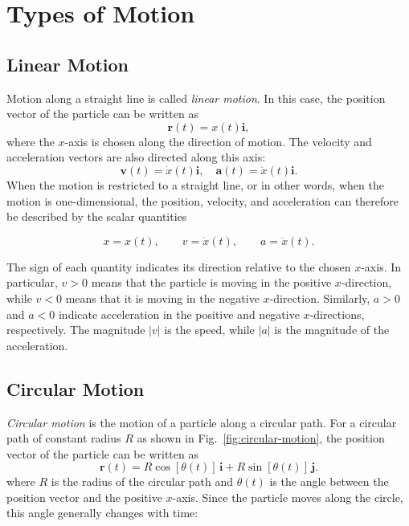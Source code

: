 \documentclass[12pt]{article}
\theoremstyle{remark}
\begin{document}
\section{Types of Motion}

\subsection{Linear Motion}
Motion along a straight line is called \emph{linear motion}. In this case, the position vector of the particle can be written as
\begin{equation}
\mathbf{r}(t) = x(t)\mathbf{i},
\end{equation}
where the $x$-axis is chosen along the direction of motion. The velocity and acceleration vectors are also directed along this axis:
\begin{equation}
\mathbf{v}(t) = \dot{x}(t)\mathbf{i}, \quad \mathbf{a}(t) = \ddot{x}(t)\mathbf{i}.
\end{equation}
When the motion is restricted to a straight line, or in other words, when the motion is one-dimensional, the position, velocity, and acceleration can therefore be described by the scalar quantities

$$
x=x(t), \qquad v=\dot{x}(t), \qquad a=\ddot{x}(t).
$$

The sign of each quantity indicates its direction relative to the chosen \(x\)-axis. In particular, \(v>0\) means that the particle is moving in the positive \(x\)-direction, while \(v<0\) means that it is moving in the negative \(x\)-direction. Similarly, \(a>0\) and \(a<0\) indicate acceleration in the positive and negative \(x\)-directions, respectively. The magnitude \(|v|\) is the speed, while \(|a|\) is the magnitude of the acceleration.


\subsection{Circular Motion}
\label{sec:circular-motion}
\emph{Circular motion} is the motion of a particle along a circular path. For a circular path of constant radius $R$ as shown in Fig.~\ref{fig:circular-motion}, the position vector of the particle can be written as
\begin{equation}
\mathbf{r}(t)
=
R\cos[\theta(t)]\,\mathbf{i}
+
R\sin[\theta(t)]\,\mathbf{j}.
\end{equation}
where $R$ is the radius of the circular path and $\theta(t)$ is the angle between the position vector and the positive $x$-axis. Since the particle moves along the circle, this angle generally changes with time:
\end{document}
